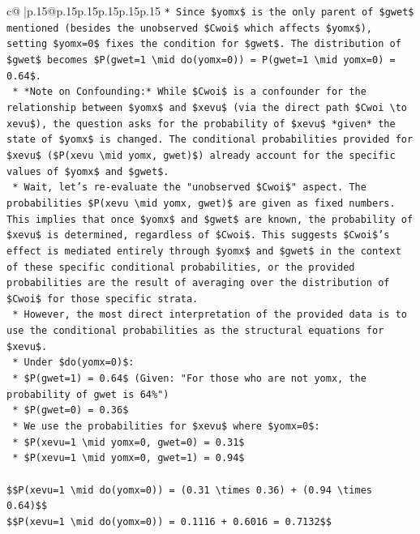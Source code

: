 \documentclass{article}
\begin{document}
{\begin{supertabular}{c@{$\;$}|p{.15\linewidth}@{}p{.15\linewidth}p{.15\linewidth}p{.15\linewidth}p{.15\linewidth}p{.15\linewidth}}
{{{\texttt{*   Since \$yomx\$ is the only parent of \$gwet\$ mentioned (besides the unobserved \$Cwoi\$ which affects \$yomx\$), setting \$yomx=0\$ fixes the condition for \$gwet\$. The distribution of \$gwet\$ becomes \$P(gwet=1 \textbackslash{}mid do(yomx=0)) = P(gwet=1 \textbackslash{}mid yomx=0) = 0.64\$.} \\
\texttt{    *   *Note on Confounding:* While \$Cwoi\$ is a confounder for the relationship between \$yomx\$ and \$xevu\$ (via the direct path \$Cwoi \textbackslash{}to xevu\$), the question asks for the probability of \$xevu\$ *given* the state of \$yomx\$ is changed. The conditional probabilities provided for \$xevu\$ (\$P(xevu \textbackslash{}mid yomx, gwet)\$) already account for the specific values of \$yomx\$ and \$gwet\$.} \\
\texttt{    *   Wait, let's re{-}evaluate the "unobserved \$Cwoi\$" aspect. The probabilities \$P(xevu \textbackslash{}mid yomx, gwet)\$ are given as fixed numbers. This implies that once \$yomx\$ and \$gwet\$ are known, the probability of \$xevu\$ is determined, regardless of \$Cwoi\$. This suggests \$Cwoi\$'s effect is mediated entirely through \$yomx\$ and \$gwet\$ in the context of these specific conditional probabilities, or the provided probabilities are the result of averaging over the distribution of \$Cwoi\$ for those specific strata.} \\
\texttt{    *   However, the most direct interpretation of the provided data is to use the conditional probabilities as the structural equations for \$xevu\$.} \\
\texttt{    *   Under \$do(yomx=0)\$:} \\
\texttt{        *   \$P(gwet=1) = 0.64\$ (Given: "For those who are not yomx, the probability of gwet is 64\%")} \\
\texttt{        *   \$P(gwet=0) = 0.36\$} \\
\texttt{        *   We use the probabilities for \$xevu\$ where \$yomx=0\$:} \\
\texttt{            *   \$P(xevu=1 \textbackslash{}mid yomx=0, gwet=0) = 0.31\$} \\
\texttt{            *   \$P(xevu=1 \textbackslash{}mid yomx=0, gwet=1) = 0.94\$} \\
\\ 
\texttt{\$\$P(xevu=1 \textbackslash{}mid do(yomx=0)) = (0.31 \textbackslash{}times 0.36) + (0.94 \textbackslash{}times 0.64)\$\$} \\
\texttt{\$\$P(xevu=1 \textbackslash{}mid do(yomx=0)) = 0.1116 + 0.6016 = 0.7132\$\$} \\
}}}
\end{supertabular}}
\end{document}
